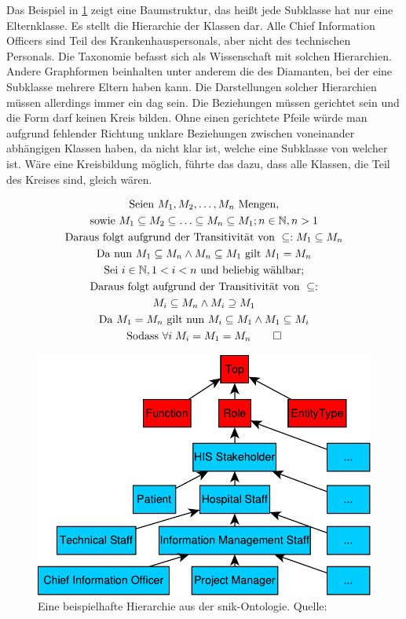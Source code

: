 Das Beispiel in \cref{fig:snikhierarchy} zeigt eine Baumstruktur, das heißt jede Subklasse hat nur eine Elternklasse.
Es stellt die Hierarchie der Klassen dar.
Alle Chief Information Officers sind Teil des Krankenhauspersonals, aber nicht des technischen Personals.
Die Taxonomie befasst sich als Wissenschaft mit solchen Hierarchien.
Andere Graphformen beinhalten unter anderem die des Diamanten, bei der eine Subklasse mehrere Eltern haben kann.
Die Darstellungen solcher Hierarchien müssen allerdings immer ein \ac{dag} sein.
Die Beziehungen müssen gerichtet sein und die Form darf keinen Kreis bilden.
Ohne einen gerichtete Pfeile würde man aufgrund fehlender Richtung unklare Beziehungen zwischen voneinander abhängigen Klassen haben, da nicht klar ist, welche eine Subklasse von welcher ist.
Wäre eine Kreisbildung möglich, führte das dazu, dass alle Klassen, die Teil des Kreises sind, gleich wären.

\begin{gather*}
\text{Seien } M_1, M_2, \ldots, M_n \text{ Mengen,} \\
\text{sowie } M_1 \subseteq M_2 \subseteq \ldots \subseteq M_n \subseteq M_1; n \in \mathbb{N}, n > 1 \\
\text{Daraus folgt aufgrund der Transitivität von } \subseteq: M_1 \subseteq M_n \\
\text{Da nun } M_1 \subseteq M_n \land M_n \subseteq M_1 \text{ gilt } M_1 = M_n \\
\text{Sei } i \in \mathbb{N}, 1 < i < n \text{ und beliebig wählbar;} \\
\text{Daraus folgt aufgrund der Transitivität von } \subseteq: \\
M_i \subseteq M_n \land M_i \supseteq M_1 \\
\text{Da } M_1 = M_n \text{ gilt nun } M_i \subseteq M_1 \land M_1 \subseteq M_i \\
\text{Sodass }\forall i\; M_i = M_1 = M_n \qed
\end{gather*}

\begin{figure}[ht]%
\centering
\includegraphics[width=\textwidth, height=\textheight, keepaspectratio]{Images/hierarchy.pdf}
\caption[Beispiel für Hierarchie]{Eine beispielhafte Hierarchie aus der \acs{snik}-Ontologie. Quelle: \citet{snikgraphposter}}
\label{fig:snikhierarchy}
\end{figure}

